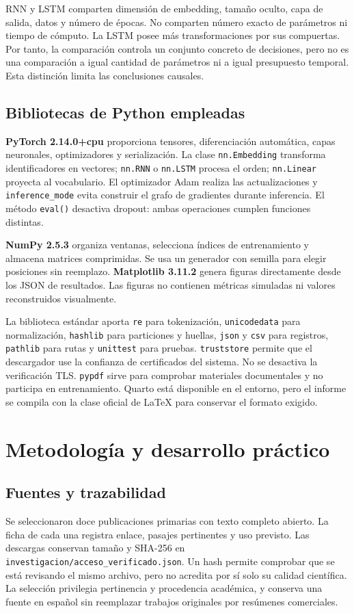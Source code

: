 RNN y LSTM comparten dimensión de embedding, tamaño oculto, capa de salida,
datos y número de épocas. No comparten número exacto de parámetros ni
tiempo de cómputo. La LSTM posee más transformaciones por sus compuertas.
Por tanto, la comparación controla un conjunto concreto de decisiones,
pero no es una comparación a igual cantidad de parámetros ni a igual
presupuesto temporal. Esta distinción limita las conclusiones causales.

\subsection{Bibliotecas de Python empleadas}
\textbf{PyTorch 2.14.0+cpu} proporciona tensores, diferenciación automática,
capas neuronales, optimizadores y serialización. La clase
\texttt{nn.Embedding} transforma identificadores en vectores;
\texttt{nn.RNN} o \texttt{nn.LSTM} procesa el orden;
\texttt{nn.Linear} proyecta al vocabulario. El optimizador Adam realiza
las actualizaciones y \texttt{inference\_mode} evita construir el grafo
de gradientes durante inferencia. El método \texttt{eval()} desactiva
dropout: ambas operaciones cumplen funciones distintas.

\textbf{NumPy 2.5.3} organiza ventanas, selecciona índices de entrenamiento
y almacena matrices comprimidas. Se usa un generador con semilla para
elegir posiciones sin reemplazo. \textbf{Matplotlib 3.11.2} genera figuras
directamente desde los JSON de resultados. Las figuras no contienen
métricas simuladas ni valores reconstruidos visualmente.

La biblioteca estándar aporta \texttt{re} para tokenización,
\texttt{unicodedata} para normalización, \texttt{hashlib} para particiones
y huellas, \texttt{json} y \texttt{csv} para registros,
\texttt{pathlib} para rutas y \texttt{unittest} para pruebas.
\texttt{truststore} permite que el descargador use la confianza de
certificados del sistema. No se desactiva la verificación TLS.
\texttt{pypdf} sirve para comprobar materiales documentales y no participa
en entrenamiento. Quarto está disponible en el entorno, pero el informe
se compila con la clase oficial de LaTeX para conservar el formato exigido.

\section{Metodología y desarrollo práctico}
\subsection{Fuentes y trazabilidad}
Se seleccionaron doce publicaciones primarias con texto completo abierto.
La ficha de cada una registra enlace, pasajes pertinentes y uso previsto.
Las descargas conservan tamaño y SHA-256 en
\texttt{investigacion/acceso\_verificado.json}. Un hash permite comprobar
que se está revisando el mismo archivo, pero no acredita por sí solo su
calidad científica. La selección privilegia pertinencia y procedencia
académica, y conserva una fuente en español sin reemplazar trabajos
originales por resúmenes comerciales.

